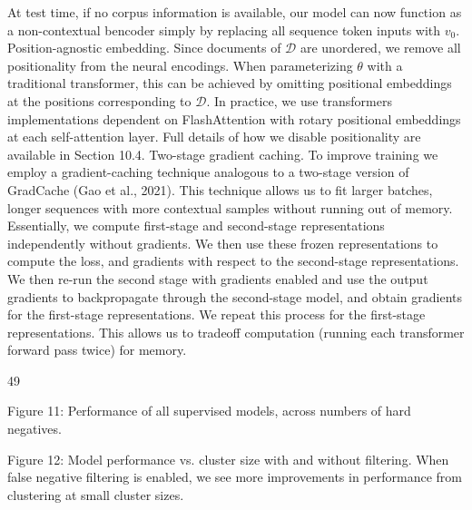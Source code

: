 \begin{tabular}
{At test time, if no corpus information is available, our model can now function as a non-contextual bencoder simply by replacing all sequence token inputs with \(v_{0}\).
Position-agnostic embedding. Since documents of \(\mathcal{D}\) are unordered, we remove all positionality from the neural encodings. When parameterizing \(\theta\) with a traditional transformer, this can be achieved by omitting positional embeddings at the positions corresponding to \(\mathcal{D}\). In practice, we use transformers implementations dependent on FlashAttention with rotary positional embeddings at each self-attention layer. Full details of how we disable positionality are available in Section 10.4.
Two-stage gradient caching. To improve training we employ a gradient-caching technique analogous to a two-stage version of GradCache (Gao et al., 2021). This technique allows us to fit larger batches, longer sequences with more contextual samples without running out of memory. Essentially, we compute first-stage and second-stage representations independently without gradients. We then use these frozen representations to compute the loss, and gradients with respect to the second-stage representations. We then re-run the second stage with gradients enabled and use the output gradients to backpropagate through the second-stage model, and obtain gradients for the first-stage representations. We repeat this process for the first-stage representations. This allows us to tradeoff computation (running each transformer forward pass twice) for memory.

49

Figure 11: Performance of all supervised models, across numbers of hard negatives.

Figure 12: Model performance vs. cluster size with and without filtering. When false negative filtering is enabled, we see more improvements in performance from clustering at small cluster sizes.

}
\end{tabular}
